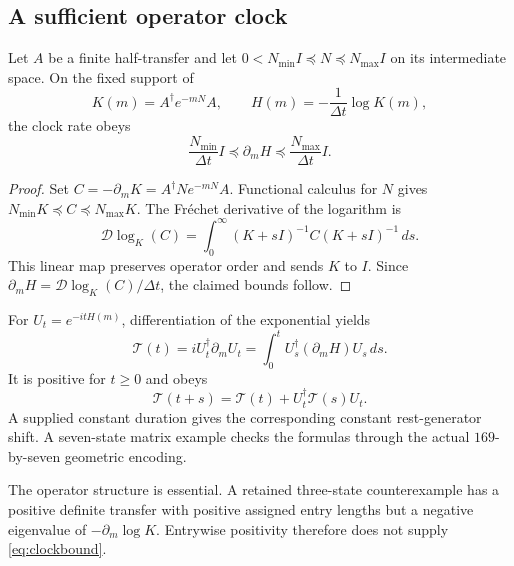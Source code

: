 \subsection{A sufficient operator clock}

\begin{theorem}
\label{thm:clock}
Let $A$ be a finite half-transfer and let
$0<N_{\min}I\preceq N\preceq N_{\max}I$ on its intermediate space. On the fixed support of
\begin{equation}
K(m)=A^\dagger e^{-mN}A,\qquad
H(m)=-\frac1{\Delta t}\log K(m),
\end{equation}
the clock rate obeys
\begin{equation}
\frac{N_{\min}}{\Delta t}I
\preceq\partial_mH
\preceq\frac{N_{\max}}{\Delta t}I.
\label{eq:clockbound}
\end{equation}
\end{theorem}
\begin{proof}
Set $C=-\partial_mK=A^\dagger Ne^{-mN}A$. Functional calculus for $N$ gives $N_{\min}K\preceq C\preceq N_{\max}K$. The Fréchet derivative of the logarithm is
\begin{equation}
\mathcal D\log_K(C)=\int_0^\infty
(K+sI)^{-1}C(K+sI)^{-1}\,ds.
\end{equation}
This linear map preserves operator order and sends $K$ to $I$. Since $\partial_mH=\mathcal D\log_K(C)/\Delta t$, the claimed bounds follow.
\end{proof}

For $U_t=e^{-itH(m)}$, differentiation of the exponential yields
\begin{equation}
\mathcal T(t)=iU_t^\dagger\partial_mU_t
=\int_0^tU_s^\dagger(\partial_mH)U_s\,ds.
\label{eq:integratedclock}
\end{equation}
It is positive for $t\ge0$ and obeys
\begin{equation}
\mathcal T(t+s)=\mathcal T(t)+U_t^\dagger\mathcal T(s)U_t.
\end{equation}
A supplied constant duration gives the corresponding constant rest-generator shift. A seven-state matrix example checks the formulas through the actual $169$-by-seven geometric encoding.

The operator structure is essential. A retained three-state counterexample has a positive definite transfer with positive assigned entry lengths but a negative eigenvalue of $-\partial_m\log K$. Entrywise positivity therefore does not supply \eqref{eq:clockbound}.

